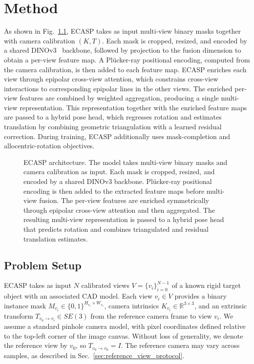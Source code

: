 \chapter{Method}
\label{sec:method}
As shown in Fig.~\ref{fig:architecture}, ECASP takes as input multi-view binary masks together with camera calibration \((K, T)\).
Each mask is cropped, resized, and encoded by a shared DINOv3~\cite{simeoni2025dinov3} backbone, followed by projection to the fusion dimension to obtain a per-view feature map.
A Pl\"ucker-ray positional encoding, computed from the camera calibration, is then added to each feature map.
ECASP enriches each view through epipolar cross-view attention, which constrains cross-view interactions to corresponding epipolar lines in the other views.
The enriched per-view features are combined by weighted aggregation, producing a single multi-view representation.
This representation together with the enriched feature maps are passed to a hybrid pose head, which regresses rotation and estimates translation by combining geometric triangulation with a learned residual correction.
During training, ECASP additionally uses mask-completion and allocentric-rotation objectives.


\begin{figure}[!htbp]
\centering


\caption{ECASP architecture. The model takes multi-view binary masks and camera calibration as input.
Each mask is cropped, resized, and encoded by a shared DINOv3 backbone.
Pl\"ucker-ray positional encoding is then added to the extracted feature maps before multi-view fusion.
The per-view features are enriched symmetrically through epipolar cross-view attention and then aggregated.
The resulting multi-view representation is passed to a hybrid pose head that predicts rotation and combines triangulated and residual translation estimates.}
\label{fig:architecture}
\end{figure}

\section{Problem Setup}
\label{sec:problem_setup}
ECASP takes as input \(N\) calibrated views \(V=\{v_i\}_{i=0}^{N-1}\) of a known rigid target object with an associated CAD model.
Each view \(v_i \in V\) provides a binary instance mask \(M_{v_i} \in \{0,1\}^{H_{v_i} \times W_{v_i}}\), camera intrinsics \(K_{v_i} \in \mathbb{R}^{3\times3}\), and an extrinsic transform \(T_{v_0\rightarrow v_i} \in SE(3)\) from the reference camera frame to view \(v_i\).
We assume a standard pinhole camera model, with pixel coordinates defined relative to the top-left corner of the image canvas.
Without loss of generality, we denote the reference view by \(v_0\), so \(T_{v_0\rightarrow v_0}=I\).
The reference camera may vary across samples, as described in Sec.~\ref{sec:reference_view_protocol}.

